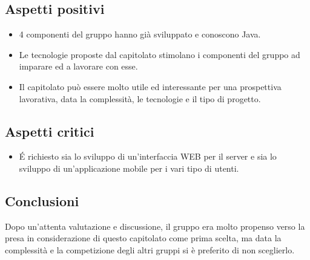 \subsection{Aspetti positivi}
\begin{itemize} 
	\item 4 componenti del gruppo hanno già sviluppato e conoscono Java.
	\item Le tecnologie proposte dal capitolato stimolano i componenti del gruppo ad imparare ed a lavorare con esse.
	\item Il capitolato può essere molto utile ed interessante per una prospettiva lavorativa, data la complessità, le tecnologie e il tipo di progetto.
\end{itemize}

\subsection{Aspetti critici}
\begin{itemize}
\item \'E richiesto sia lo sviluppo di un'interfaccia WEB per il server e sia lo sviluppo di un'applicazione mobile per i vari tipo di utenti.
\end{itemize}

\subsection{Conclusioni}
Dopo un'attenta valutazione e discussione, il gruppo era molto propenso verso la presa in considerazione di questo capitolato come prima scelta, ma data la complessità e la competizione degli altri gruppi si è preferito di non sceglierlo.
